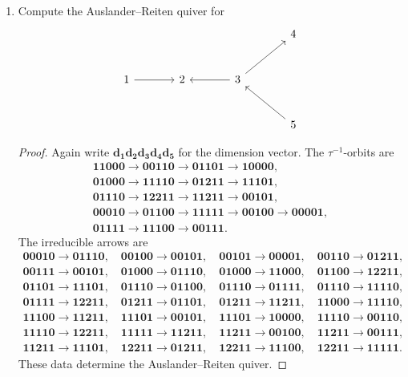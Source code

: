 \documentclass[11pt, a4paper]{article}
\newcommand{\vect}[1]{\mathbf{#1}}
\begin{document}
\begin{enumerate}[leftmargin=*, label=\textbf{\arabic*.}]
\item Compute the Auslander--Reiten quiver for
\[
\begin{tikzcd}[column sep=large,row sep=large]
&&&4\\
1\arrow[r]&2&3\arrow[l]\arrow[ur]&\\
&&&5\arrow[ul]
\end{tikzcd}
\]

\begin{proof}
Again write $\vect{d_1d_2d_3d_4d_5}$ for the dimension vector. The $\tau^{-1}$-orbits are
\[
\begin{gathered}
\vect{11000}\to\vect{00110}\to\vect{01101}\to\vect{10000},\\
\vect{01000}\to\vect{11110}\to\vect{01211}\to\vect{11101},\\
\vect{01110}\to\vect{12211}\to\vect{11211}\to\vect{00101},\\
\vect{00010}\to\vect{01100}\to\vect{11111}\to\vect{00100}\to\vect{00001},\\
\vect{01111}\to\vect{11100}\to\vect{00111}.
\end{gathered}
\]
The irreducible arrows are
\[
\begin{gathered}
\vect{00010}\to\vect{01110},\quad \vect{00100}\to\vect{00101},\quad \vect{00101}\to\vect{00001},\quad \vect{00110}\to\vect{01211},\\
\vect{00111}\to\vect{00101},\quad \vect{01000}\to\vect{01110},\quad \vect{01000}\to\vect{11000},\quad \vect{01100}\to\vect{12211},\\
\vect{01101}\to\vect{11101},\quad \vect{01110}\to\vect{01100},\quad \vect{01110}\to\vect{01111},\quad \vect{01110}\to\vect{11110},\\
\vect{01111}\to\vect{12211},\quad \vect{01211}\to\vect{01101},\quad \vect{01211}\to\vect{11211},\quad \vect{11000}\to\vect{11110},\\
\vect{11100}\to\vect{11211},\quad \vect{11101}\to\vect{00101},\quad \vect{11101}\to\vect{10000},\quad \vect{11110}\to\vect{00110},\\
\vect{11110}\to\vect{12211},\quad \vect{11111}\to\vect{11211},\quad \vect{11211}\to\vect{00100},\quad \vect{11211}\to\vect{00111},\\
\vect{11211}\to\vect{11101},\quad \vect{12211}\to\vect{01211},\quad \vect{12211}\to\vect{11100},\quad \vect{12211}\to\vect{11111}.
\end{gathered}
\]
These data determine the Auslander--Reiten quiver.
\end{proof}


\end{enumerate}
\end{document}
